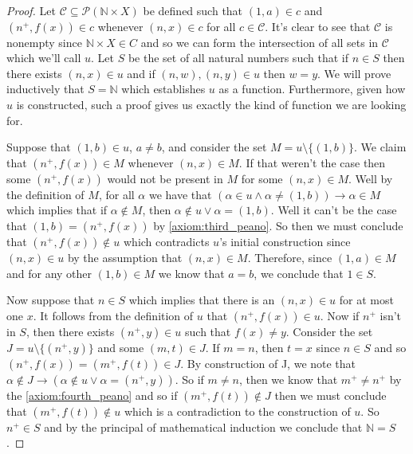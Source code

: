 \documentclass{article}
\theoremstyle{definition}
\theoremstyle{definition}
\theoremstyle{plain}
\theoremstyle{remark}
\theoremstyle{plain}
\theoremstyle{remark}
\theoremstyle{plain}
\theoremstyle{plain}
\theoremstyle{plain}
\begin{document}
\begin{proof}
Let \( \mathcal{C} \subseteq \mathcal{P} (\mathbb{N} \times X )\) be defined 
such that \( (1, a) \in c \) and \( (n^{+}, f(x)) \in c \) whenever 
\( ( n, x ) \in c \) for all \( c \in \mathcal{C} \). It's clear to see that 
\( \mathcal{C} \) is nonempty since \( \mathbb{N} \times X \in C \) and so we 
can form the intersection of all sets in \( \mathcal{C} \) which we'll call 
\( u \). Let \( S \) be the set of all natural numbers such that if 
\( n \in S \) then there exists \( (n, x) \in u \) and if 
\( (n, w), (n,y) \in u\) then \( w = y \). We will prove inductively that 
\( S = \mathbb{N} \) which establishes \( u \) as a function. Furthermore, 
given how \( u \) is constructed, such a proof gives us exactly the kind of 
function we are looking for. 

Suppose that \( (1, b) \in u \), \( a \neq b\), and consider the set 
\( M = u \setminus \{ (1,b) \} \).  We claim that \( (n^{+}, f(x)) \in M \) 
whenever \( ( n, x ) \in M \). If that weren't the case then some 
\( (n^{+}, f(x)) \) would not be present in \( M \) for some \( (n,x) \in M \). 
Well by the definition of \( M \), for all \( \alpha \) we have that 
\( (\alpha \in u \land \alpha \neq (1,b)) \rightarrow \alpha \in M \) which 
implies that if \( \alpha \not\in M \), then 
\( \alpha \not\in u \lor \alpha = (1, b) \). Well  it can't be the case that 
\( (1,b) = (n^{+},f(x)) \) by \autoref{axiom:third_peano}. So then we must 
conclude that \( (n^{+}, f(x)) \not\in u \) which 
contradicts \( u \)'s initial construction since \( (n,x) \in u \) by the 
assumption that \( (n,x) \in M \). Therefore, since \((1,a) \in M \) and for any 
other \( (1,b) \in M \) we know that \( a = b \), we conclude that 
\( 1 \in S \). 

Now suppose that \( n \in S \) which implies that there is an \( (n,x) \in u \) 
for at most one \( x \). It follows from the definition of \( u \) that 
\( (n^{+}, f(x)) \in u \). Now if \( n^{+} \) isn't in \( S \), then there 
exists \( (n^{+}, y) \in u \) such that \( f(x) \neq y \). Consider the set 
\( J = u \setminus \{(n^{+},y)\} \) and some \( (m, t) \in J \). If \( m = n \), 
then \( t = x \) since \( n \in S \) and so 
\( (n^{+}, f(x)) = (m^{+},f(t)) \in J \). By construction of J, we note that 
\( \alpha \not\in J \rightarrow (\alpha \not\in u \lor \alpha = (n^{+},y))\). 
So if \( m \neq n \), then we know that \( m^{+} \neq n^{+} \) by the 
\autoref{axiom:fourth_peano} and so if \( (m^{+}, f(t)) \not\in J \) then we 
must conclude that \( (m^{+}, f(t)) \not\in u \) which is a contradiction to the 
construction of \( u \). So \( n^{+} \in S \) and by the principal of 
mathematical induction we conclude that \( \mathbb{N}  = S \). 
\end{proof}
\end{document}
